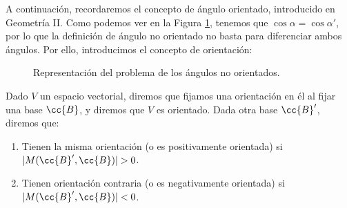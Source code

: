 A continuación, recordaremos el concepto de ángulo orientado, introducido en Geometría II. Como podemos ver en la Figura \ref{fig:ProblemaOrientacion}, tenemos que $\cos\alpha = \cos\alpha'$, por lo que la definición de ángulo no orientado no basta para diferenciar ambos ángulos. Por ello, introducimos el concepto de orientación:
\begin{figure}[H]
    \centering
    \caption{Representación del problema de los ángulos no orientados.}
    \label{fig:ProblemaOrientacion}
\end{figure}

\begin{definicion}
    Dado $V$ un espacio vectorial, diremos que fijamos una orientación en él al fijar una base $\cc{B}$, y diremos que $V$ es orientado. Dada otra base $\cc{B}'$, diremos que:
    \begin{enumerate}
        \item Tienen la misma orientación (o es positivamente orientada) si $|M(\cc{B}',\cc{B})|>0$.
        \item Tienen orientación contraria (o es negativamente orientada) si $|M(\cc{B}',\cc{B})|<0$.
    \end{enumerate}
\end{definicion}

